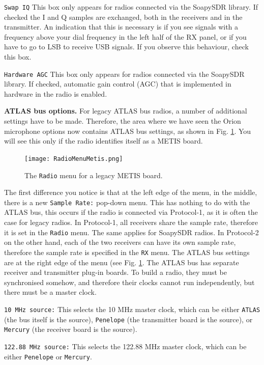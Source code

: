 \documentclass[12pt]{book}
\def\rett#1{\texttt{\color{red}#1}}
\def\bltt#1{\texttt{\color{blue}#1}}
\begin{document}
\rett{Swap IQ} This box only appears for radios connected via the SoapySDR library. If checked
the I and Q samples are exchanged, both in the receivers and in the transmitter. An indication
that this is necessary is if you see signals with a frequency above your dial frequency in
the left half of the RX panel, or if you have to go to LSB to receive USB signals. If you
observe this behaviour, check this box.

\rett{Hardware AGC} This box only appears for radios connected via the SoapySDR library.
If checked, automatic gain control (AGC) that is implemented in hardware in the radio is enabled.

\textbf{ATLAS bus options.} For legacy ATLAS bus radios, a number of additional settings have to be
made. Therefore, the area where we have seen the Orion microphone options now contains ATLAS bus
settings, as shown in Fig. \ref{fig:RadioMenuMetis}. You will see this only if the radio identifies
itself as a METIS board.

\begin{figure}[ht]
\center
\texttt{[image: RadioMenuMetis.png]}
\caption{The \bltt{Radio} menu for a legacy METIS board.}
\label{fig:RadioMenuMetis}
\end{figure}

The first difference you notice is that at the left edge of the menu, in the middle,
there is a new \rett{Sample Rate:} pop-down menu. This has nothing to do with the
ATLAS bus, this occurs if the radio is connected via Protocol-1, as it is often the case for
legacy radios. In Protocol-1, all receivers share the sample rate, therefore it is set in the
\bltt{Radio} menu. The same applies for SoapySDR radios. In Protocol-2 on the other hand, each
of the two receivers can have its own sample rate, therefore the sample rate is specified
in the \bltt{RX} menu. The ATLAS bus settings are at the right edge of the menu (see Fig.
\ref{fig:RadioMenuMetis}. The ATLAS bus has separate receiver and transmitter plug-in boards.
To build a radio, they must be synchronised somehow, and therefore their clocks cannot run
independently, but there must be a master clock.

\rett{10 MHz source:} This selects the 10 MHz master clock, which can be either \texttt{ATLAS}
(the bus itself is the source), \texttt{Penelope} (the transmitter board is the source),
or \texttt{Mercury} (the receiver board is the source).

\rett{122.88 MHz source:} This selects the 122.88 MHz master clock, which can be either
\texttt{Penelope} or \texttt{Mercury}.
\end{document}
